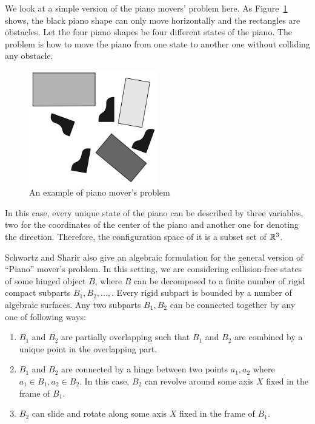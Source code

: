 \begin{example}
  We look at a simple version of the piano movers' problem here.
  As Figure~\ref{fig:piano} shows, the black piano shape can only move horizontally and the rectangles are obstacles.
  Let the four piano shapes be four different states of the piano.
  The problem is how to move the piano from one state to another one without colliding any obstacle.
  \begin{figure}
    \begin{center}
      \includegraphics[width=0.5\textwidth]{fig-piano}
    \end{center}
    \caption{An example of piano mover's problem}
    \label{fig:piano}
  \end{figure}
\end{example}
In this case, every unique state of the piano can be described by three variables, two for the coordinates of the center of the piano and another one for denoting the direction.
Therefore, the configuration space of it is a subset set of \(\mathbb{R}^3\).

Schwartz and Sharir also give an algebraic formulation for the general version of ``Piano'' mover's problem.
In this setting, we are considering collision-free states of some hinged object \(B\), where \(B\) can be decomposed to a finite number of rigid compact subparts \(B_1,B_2,\dots,\).
Every rigid subpart is bounded by a number of algebraic surfaces.
Any two subparts \(B_1, B_2\) can be connected together by any one of following ways:
\begin{enumerate}[label=\arabic*)]
\item \(B_1\) and \(B_2\) are partially overlapping such that \(B_1\) and \(B_2\) are combined by a unique point in the overlapping part.
\item \(B_1\) and \(B_2\) are connected by a hinge between two points \(a_1, a_2\) where \(a_1\in B_1, a_2\in B_2\). In this case, \(B_2\) can revolve around some axis \(X\) fixed in the frame of \(B_1\).
\item \(B_2\) can slide and rotate along some axis \(X\) fixed in the frame of \(B_1\).
\end{enumerate}


